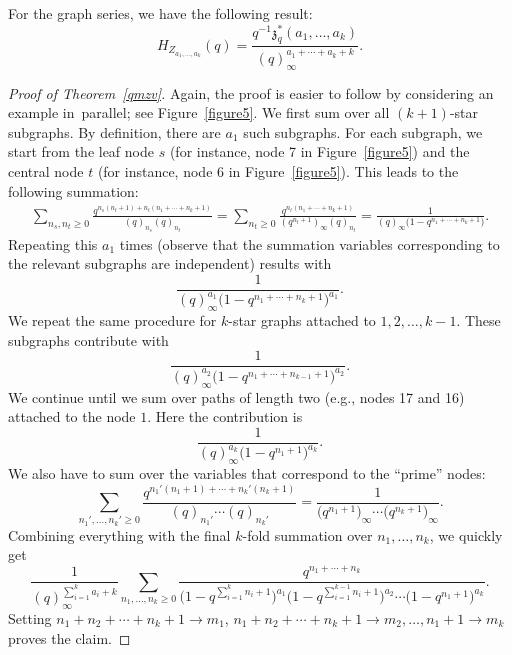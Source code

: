 \documentclass[10pt,a4paper]{amsart}
\numberwithin{equation}{section}
\theoremstyle{definition}
\begin{document}
For the graph series, we have the following result:
\[
H_{Z_{a_1,\dots,a_k}}(q)=\frac{q^{-1}{\mathfrak{z}}^*_q(a_1,\dots,a_k)}{(q)_\infty^{a_1+\cdots +a_k+k}}.
\]
\begin{proof}[Proof of Theorem~\ref{qmzv}]
Again, the proof is easier to follow by considering an example in~parallel; see Figure~\ref{figure5}.
We first sum over all $(k+1)$-star subgraphs. By definition, there are $a_1$ such subgraphs.
For each subgraph, we start from the leaf node $s$ (for instance, node 7 in Figure~\ref{figure5}) and the central node $t$ (for instance, node 6 in Figure~\ref{figure5}).
This leads to the following summation:
\begin{align*}
\sum_{n_s,n_t \geq 0} \frac{q^{n_s(n_t+1)+n_t(n_1+\cdots + n_k+1)}}{(q)_{n_s}(q)_{n_t}}
=\sum_{n_t \geq 0} \frac{q^{n_t(n_1+\cdots + n_k+1)}}{(q^{n_t+1})_\infty (q)_{n_t} }= \frac{1}{(q)_\infty \bigl(1-q^{n_1+\cdots +n_k+1}\bigr)}.
\end{align*}
Repeating this $a_1$ times (observe that the summation variables corresponding to the relevant subgraphs are independent) results with
\[
\frac{1}{(q)^{a_1}_\infty \bigl(1-q^{n_1+\cdots +n_k+1}\bigr)^{a_1}}.
\]
We repeat the same procedure for $k$-star graphs attached to $1,2,\dots,k-1$. These subgraphs contribute with
\[
\frac{1}{(q)^{a_2}_\infty \bigl(1-q^{n_1+\cdots +n_{k-1}+1}\bigr)^{a_2}}.
\]
We continue until we sum over paths of length two (e.g., nodes 17 and 16) attached to the node $1$. Here the contribution is
\[
\frac{1}{(q)^{a_k}_\infty \bigl(1-q^{n_1+1}\bigl)^{a_k}}.
\]
We also have to sum over the variables that correspond to the ``prime'' nodes:
\[
\sum_{ n_1',\dots,n_k' \geq 0} \frac{q^{n_1'(n_1+1)+\cdots + n_k'(n_k+1)}}{(q)_{n_1'} \cdots (q)_{n_k'}}=\frac{1}{\bigl(q^{n_1+1}\bigr)_\infty \cdots \bigl(q^{n_k+1}\bigr)_\infty}.
\]
Combining everything with the final $k$-fold summation over $n_1,\dots,n_k$, we quickly get
\[
\frac{1}{(q)_\infty^{\sum_{i=1}^k a_i+k}} \sum_{n_1,\dots,n_k \geq 0} \frac{q^{n_1+ \cdots + n_k}}{\bigl(1-q^{\sum_{i=1}^{k} n_i+1}\bigr)^{a_1} \bigl(1-q^{\sum_{i=1}^{k-1} n_i+1}\bigr)^{a_2} \cdots \bigl(1-q^{n_1+1}\bigr)^{a_k}}.
\]
Setting $n_1+n_2+\cdots + n_k+1 \to m_1$, $n_1+n_2+\cdots + n_k+1 \to m_2,\dots,n_1+1 \to m_k$ proves the claim.
\end{proof}
\end{document}

